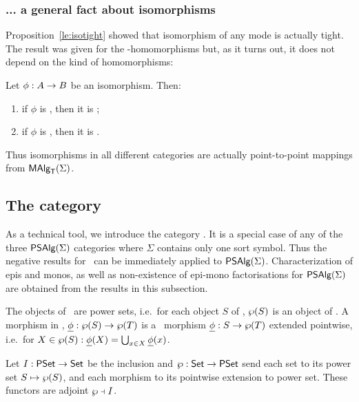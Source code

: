 \documentclass[10pt]{article}
\begin{document}
\subsubsection*{... a general fact about isomorphisms}
Proposition~\ref{le:isotight} showed that isomorphism of any mode
is actually tight. The result was given for the 
\PP-homomorphisms but, as it turns out, it does not depend on the kind
of homomorphisms:

\begin{Prop}
\label{le:isopp}
Let $\phi:A\rightarrow B$ be an isomorphism. Then: 
\begin{enumerate}\MyLPar
\item if $\phi$ is \SSs, then it is \PS;
\item if $\phi$ is \PS, then it is \PP.
\end{enumerate}
\end{Prop}

\noindent
Thus isomorphisms in all different categories
are actually point-to-point mappings from $\mbox{\rm\sf MAlg}_{\sf T}(\Sigma)$.




\subsection{The category \PSt }

As a technical tool, we introduce the category \PSt. It is a special
case of any of the three $\mbox{\sf PSAlg}(\Sigma)$ categories where $\Sigma$ contains
only one sort symbol. Thus the negative results for \PSt\ can be
immediately applied to $\mbox{\sf PSAlg}(\Sigma)$.  Characterization of epis and monos,
as well as non-existence of epi-mono factorisations for $\mbox{\sf PSAlg}(\Sigma)$ are
obtained from the results in this subsection.

\begin{Definition}
The objects of \PSt\ are power sets, i.e.\ for each object $S$ of
\Set, $\wp(S)$ is an object of \PSt.  A morphism in \PSt,
$\underline {\phi}:\wp(S)\rightarrow \wp(T)$ is a \Set\ morphism
$\underline {\phi}:S\rightarrow\wp(T)$ extended pointwise, i.e.\ for
$X\in\wp(S) : \underline {\phi}(X) = \bigcup_{x\in X}\underline {\phi}(x)$.
\end{Definition}

\begin{Prop}
\label{le:adjSPS}
Let $I:\mbox{\rm\sf PSet}\rightarrow\mbox{\rm\sf Set}$ be the inclusion and $\wp:\mbox{\rm\sf Set}\rightarrow\mbox{\rm\sf PSet}$ send
each set to its power set $S\mapsto\wp(S)$, and each morphism to its
pointwise extension to power set. These functors are adjoint
$\wp\mathrel{\scriptstyle\dashv} I$.
\end{Prop}
\end{document}
